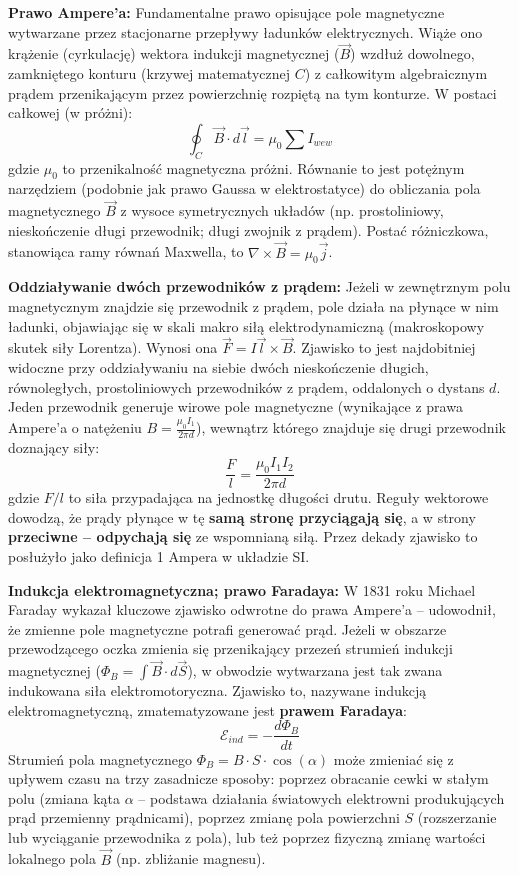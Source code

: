 \documentclass[11pt, a4paper]{article}
\begin{document}
\textbf{Prawo Ampere'a:}
Fundamentalne prawo opisujące pole magnetyczne wytwarzane przez stacjonarne przepływy ładunków elektrycznych. Wiąże ono krążenie (cyrkulację) wektora indukcji magnetycznej ($\vec{B}$) wzdłuż dowolnego, zamkniętego konturu (krzywej matematycznej $C$) z całkowitym algebraicznym prądem przenikającym przez powierzchnię rozpiętą na tym konturze. W postaci całkowej (w próżni):
\[
\oint_C \vec{B} \cdot d\vec{l} = \mu_0 \sum I_{wew}
\]
gdzie $\mu_0$ to przenikalność magnetyczna próżni. Równanie to jest potężnym narzędziem (podobnie jak prawo Gaussa w elektrostatyce) do obliczania pola magnetycznego $\vec{B}$ z wysoce symetrycznych układów (np. prostoliniowy, nieskończenie długi przewodnik; długi zwojnik z prądem). Postać różniczkowa, stanowiąca ramy równań Maxwella, to $\nabla \times \vec{B} = \mu_0 \vec{j}$.

\textbf{Oddziaływanie dwóch przewodników z prądem:}
Jeżeli w zewnętrznym polu magnetycznym znajdzie się przewodnik z prądem, pole działa na płynące w nim ładunki, objawiając się w skali makro siłą elektrodynamiczną (makroskopowy skutek siły Lorentza). Wynosi ona $\vec{F} = I \vec{l} \times \vec{B}$.
Zjawisko to jest najdobitniej widoczne przy oddziaływaniu na siebie dwóch nieskończenie długich, równoległych, prostoliniowych przewodników z prądem, oddalonych o dystans $d$. Jeden przewodnik generuje wirowe pole magnetyczne (wynikające z prawa Ampere'a o natężeniu $B = \frac{\mu_0 I_1}{2\pi d}$), wewnątrz którego znajduje się drugi przewodnik doznający siły:
\[
\frac{F}{l} = \frac{\mu_0 I_1 I_2}{2\pi d}
\]
gdzie $F/l$ to siła przypadająca na jednostkę długości drutu. Reguły wektorowe dowodzą, że prądy płynące w tę \textbf{samą stronę przyciągają się}, a w strony \textbf{przeciwne – odpychają się} ze wspomnianą siłą. Przez dekady zjawisko to posłużyło jako definicja 1 Ampera w układzie SI.

\textbf{Indukcja elektromagnetyczna; prawo Faradaya:}
W 1831 roku Michael Faraday wykazał kluczowe zjawisko odwrotne do prawa Ampere'a – udowodnił, że zmienne pole magnetyczne potrafi generować prąd. Jeżeli w obszarze przewodzącego oczka zmienia się przenikający przezeń strumień indukcji magnetycznej ($\Phi_B = \int \vec{B} \cdot d\vec{S}$), w obwodzie wytwarzana jest tak zwana indukowana siła elektromotoryczna. Zjawisko to, nazywane indukcją elektromagnetyczną, zmatematyzowane jest \textbf{prawem Faradaya}:
\[
\mathcal{E}_{ind} = -\frac{d\Phi_B}{dt}
\]
Strumień pola magnetycznego $\Phi_B = B \cdot S \cdot \cos(\alpha)$ może zmieniać się z upływem czasu na trzy zasadnicze sposoby: poprzez obracanie cewki w stałym polu (zmiana kąta $\alpha$ – podstawa działania światowych elektrowni produkujących prąd przemienny prądnicami), poprzez zmianę pola powierzchni $S$ (rozszerzanie lub wyciąganie przewodnika z pola), lub też poprzez fizyczną zmianę wartości lokalnego pola $\vec{B}$ (np. zbliżanie magnesu).
\end{document}
